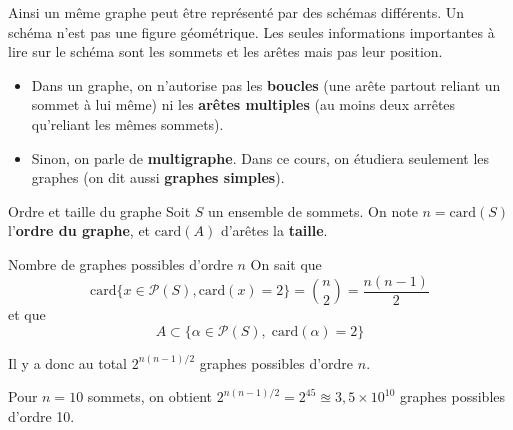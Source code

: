 Ainsi un même graphe peut être représenté par des schémas différents. Un schéma n'est pas une figure géométrique. Les seules informations importantes à lire sur le schéma sont les sommets et les arêtes mais pas leur position.

\begin{note}

\begin{itemize}
    \item Dans un graphe, on n'autorise pas les \textbf{boucles} (une arête partout reliant un sommet à lui même) ni les \textbf{arêtes multiples} (au moins deux arrêtes qu'reliant les mêmes sommets).
    \item Sinon, on parle de \textbf{multigraphe}. Dans ce cours, on étudiera seulement les graphes (on dit aussi \textbf{graphes simples}).
\end{itemize}
\end{note}

\begin{Definition}[colbacktitle=red!75!black]{Ordre et taille du graphe}{}
    Soit $S$ un ensemble de sommets. On note $n = \mathrm{card} (S)$ l'\textbf{ordre du graphe}, et $\mathrm{car d}(A)$ d'arêtes la \textbf{taille}.

\end{Definition}

\begin{Prop}{Nombre de graphes possibles d'ordre $n$}{}
On sait que 
\[
  \mathrm{car d}\{x \in \mathcal{P} (S), \mathrm{card}(x) =2 \} = \binom{n}{2} = \frac{n(n-1)}{2} 
\]
et que \[
    A \subset  \{ \alpha \in \mathcal{P} (S),\; \mathrm{car d}(\alpha) =2 \}
\]

Il y a donc au total $2^{n(n-1) /2}$ graphes possibles d'ordre  $n$.
\end{Prop}

\begin{Example}{}{}
    Pour $n = 10$ sommets, on obtient $2^{n(n-1)/2} = 2^{45} \approxeq 3,5 \times 10^{10}$ graphes possibles d'ordre 10.
\end{Example}

